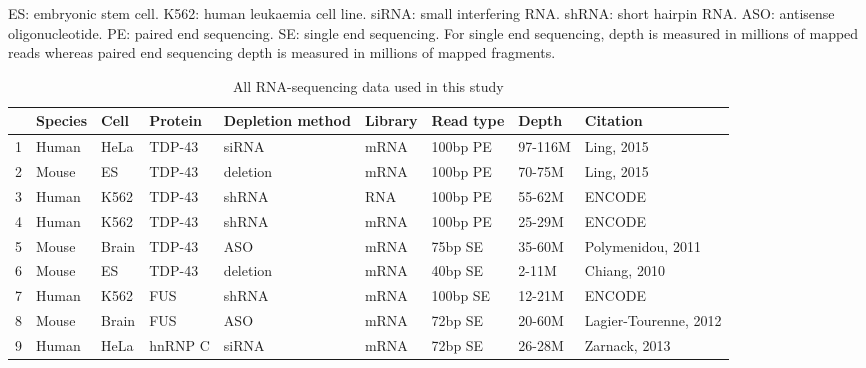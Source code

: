 \begin{table}[h!]
	\caption{All RNA-sequencing data used in this study}
	 ES: embryonic stem cell. K562: human leukaemia cell line. siRNA: small interfering RNA. shRNA: short hairpin RNA. ASO: antisense oligonucleotide. PE: paired end sequencing. SE: single end sequencing. For single end sequencing, depth is measured in millions of mapped reads whereas paired end sequencing depth is measured in millions of mapped fragments.
	\begin{center}
		\begin{small}
			\begin{tabular}{l|lllp{1.5cm}llll}
				& Species & Cell & Protein & Depletion method & Library & Read type & Depth & Citation\\
				\hline
				1 & Human & HeLa & TDP-43 & siRNA & mRNA & 100bp PE & 97-116M & Ling, 2015\\
				2 & Mouse & ES & TDP-43 & deletion & mRNA & 100bp PE & 70-75M & Ling, 2015\\
				3 & Human & K562 & TDP-43 & shRNA & RNA & 100bp PE & 55-62M & ENCODE\\
				4 & Human & K562 & TDP-43 & shRNA & mRNA & 100bp PE & 25-29M & ENCODE\\
				5 & Mouse & Brain & TDP-43 & ASO & mRNA & 75bp SE & 35-60M & Polymenidou, 2011\\
				6 & Mouse & ES & TDP-43 & deletion & mRNA & 40bp SE & 2-11M & Chiang, 2010\\
				7 & Human & K562 & FUS & shRNA & mRNA & 100bp SE & 12-21M & ENCODE\\
				8 & Mouse & Brain & FUS & ASO & mRNA & 72bp SE & 20-60M & Lagier-Tourenne, 2012\\
				9 & Human & HeLa & hnRNP C & siRNA & mRNA & 72bp SE & 26-28M & Zarnack, 2013\\
			\end{tabular}
		\end{small}
	\end{center}
\end{table}


